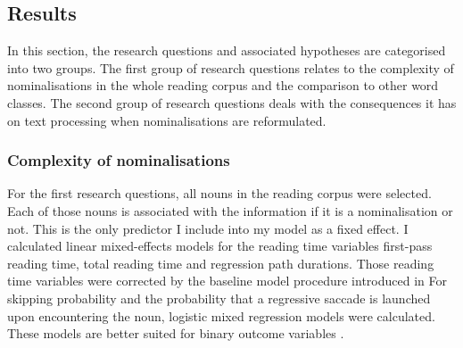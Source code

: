\documentclass[output=paper]{langsci/langscibook}
\begin{document}
\subsection{\label{bkm:Ref283726141}Results}

In this section, the research questions and associated hypotheses are categorised into two groups. The first group of research questions relates to the complexity of nominalisations in the whole reading corpus and the comparison to other word classes. The second group of research questions deals with the consequences it has on text processing when nominalisations are reformulated. 

\subsubsection{Complexity of nominalisations}

For the first research questions, all nouns in the reading corpus were selected. Each of those nouns is associated with the information if it is a nominalisation or not. This is the only predictor I include into my model as a fixed effect. I calculated linear mixed-effects models for the reading time variables first-pass reading time, total reading time and regression path durations. Those reading time variables were corrected by the baseline model procedure introduced in  For skipping probability and the probability that a regressive saccade is launched upon encountering the noun, logistic mixed regression models were calculated. These models are better suited for binary outcome variables \citep[cf. ][]{Jaeger2008}.
\end{document}
